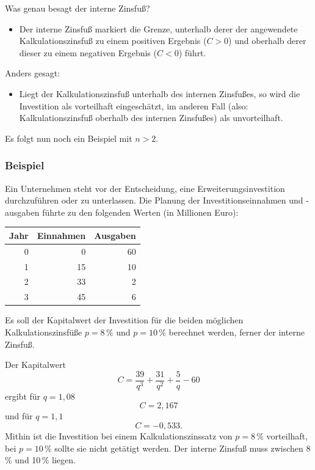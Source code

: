 Was genau besagt der interne Zinsfuß?
\begin{itemize}
  \item Der interne Zinsfuß markiert die Grenze, unterhalb derer der angewendete Kalkulationszinsfuß zu einem positiven Ergebnis ($C > 0$) und oberhalb derer dieser zu einem negativen Ergebnis ($C < 0$) führt.
\end{itemize}
Anders gesagt:
\begin{itemize}
  \item Liegt der Kalkulationszinsfuß unterhalb des internen Zinsfußes, so wird die Investition als vorteilhaft eingeschätzt, im anderen Fall (also: Kalkulationszinsfuß oberhalb des internen Zinsfußes) als unvorteilhaft.
\end{itemize}

Es folgt nun noch ein Beispiel mit $n > 2$.

\subsubsection{Beispiel}

Ein Unternehmen steht vor der Entscheidung, eine Erweiterungsinvestition durchzuführen oder zu unterlassen. Die Planung der Investitionseinnahmen und -ausgaben führte zu den folgenden Werten (in Millionen Euro):

\begin{center}
  \centering
  \begin{tabular}{rrr}
    \hline
    Jahr & Einnahmen & Ausgaben\\
    \hline
    0 & 0 & 60\\
    1 & 15 & 10\\
    2 & 33 & 2\\
    3 & 45 & 6\\
    \hline
  \end{tabular}
\end{center}

Es soll der Kapitalwert der Investition für die beiden möglichen Kalkulationszinsfüße $p = 8\,\%$ und $p = 10\,\%$ berechnet werden, ferner der interne Zinsfuß.

Der Kapitalwert
\[ C = \frac{39}{q^3} + \frac{31}{q^2} + \frac{5}{q} - 60 \]
ergibt für $q = 1{,}08$
\[ C = 2{,}167 \]
und für $q = 1{,}1$
\[ C = -0{,}533 . \]
Mithin ist die Investition bei einem Kalkulationszinssatz von $p = 8\,\%$ vorteilhaft, bei $p = 10\,\%$ sollte sie nicht getätigt werden. Der interne Zinsfuß muss zwischen 8\,\% und 10\,\% liegen.


